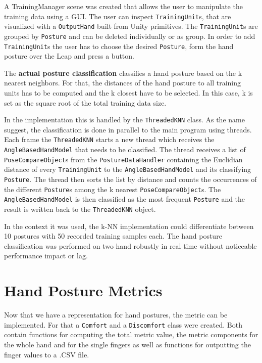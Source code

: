 A TrainingManager scene was created that allows the user to manipulate the training data using a GUI. The user can inspect \texttt{TrainingUnit}s, that are visualized with a \texttt{OutputHand} built from Unity primitives. The \texttt{TrainingUnit}s are grouped by \texttt{Posture} and can be deleted individually or as group. In order to add \texttt{TrainingUnit}s the user has to choose the desired \texttt{Posture}, form the hand posture over the Leap and press a button. 

The \textbf{actual posture classification} classifies a hand posture based on the k nearest neighbors. For that, the distances of the hand posture to all training units has to be computed and the k closest have to be selected. In this case, k is set as the square root of the total training data size.

In the implementation this is handled by the \texttt{ThreadedKNN} class. As the name suggest, the classification is done in parallel to the main program using threads. Each frame the \texttt{ThreadedKNN} starts a new thread which receives the \texttt{AngleBasedHandModel} that needs to be classified. The thread receives a list of \texttt{PoseCompareObject}s from the \texttt{PostureDataHandler} containing the Euclidian distance of every \texttt{TrainingUnit} to the \texttt{AngleBasedHandModel} and its classifying \texttt{Posture}. The thread then sorts the list by distance and counts the occurrences of the different \texttt{Posture}s among the k nearest \texttt{PoseCompareObject}s. The \texttt{AngleBasedHandModel} is then classified as the most frequent \texttt{Posture} and the result is written back to the \texttt{ThreadedKNN} object.

In the context it was used, the k-NN implementation could differentiate between 10 postures with 50 recorded training samples each. The hand posture classification was performed on two hand robustly in real time without noticeable performance impact or lag. 


\section{Hand Posture Metrics}\label{chapter:handosturemetric}

Now that we have a representation for hand postures, the metric can be implemented. For that a \texttt{Comfort} and a \texttt{Discomfort} class were created. Both contain functions for computing the total metric value, the metric components for the whole hand and for the single fingers as well as functions for outputting the finger values to a .CSV file. 


